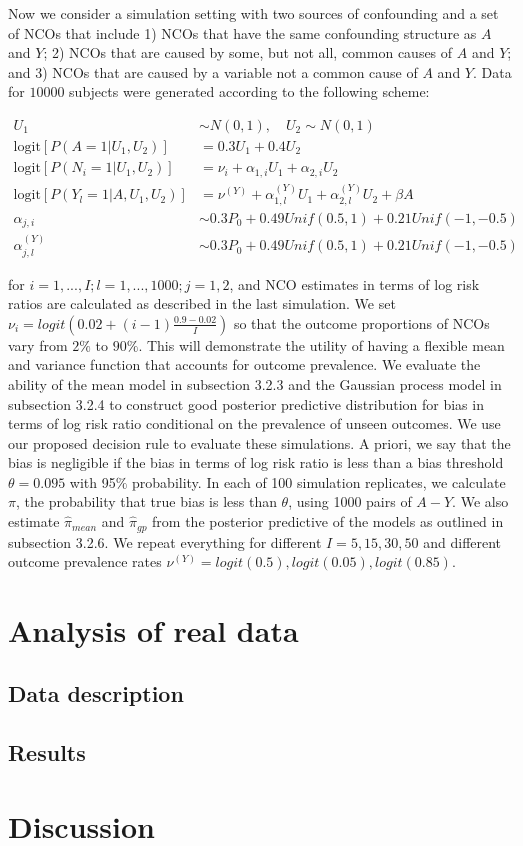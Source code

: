 Now we consider a simulation setting with two sources of confounding and a set of NCOs that include 1) NCOs that have the same confounding structure as $A$ and $Y$; 2) NCOs that are caused by some, but not all, common causes of $A$ and $Y$; and 3) NCOs that are caused by a variable not a common cause of $A$ and $Y$. Data for $10000$ subjects were generated according to the following scheme:

\begin{align*}
    U_1 &\sim N(0, 1), \quad U_2 \sim N(0, 1)\\
    \text{logit}[P(A=1|U_1, U_2)] &= 0.3 U_1 + 0.4 U_2\\
    \text{logit}[P(N_{i}=1|U_1, U_2)] &= \nu_i + \alpha_{1,i} U_1 + \alpha_{2,i} U_2 \\
    \text{logit}[P(Y_l=1|A, U_1, U_2)] &= \nu^{(Y)} + \alpha^{(Y)}_{1,l} U_1 + \alpha^{(Y)}_{2, l}U_2 + \beta A\\
    \alpha_{j,i} &\sim 0.3P_0 + 0.49 Unif(0.5, 1) + 0.21 Unif(-1, -0.5)\\
    \alpha^{(Y)}_{j,l} &\sim 0.3P_0 + 0.49 Unif(0.5, 1) + 0.21 Unif(-1, -0.5)
\end{align*}

\noindent for $i=1,..., I; l=1,...,1000; j=1,2$, and NCO estimates in terms of log risk ratios are calculated as described in the last simulation. We set $\nu_i = logit(0.02 + (i - 1)\frac{0.9-0.02}{I})$ so that the outcome proportions of NCOs vary from $2\%$ to $90\%$. This will demonstrate the utility of having a flexible mean and variance function that accounts for outcome prevalence. We evaluate the ability of the mean model in subsection 3.2.3 and the Gaussian process model in subsection 3.2.4 to construct good posterior predictive distribution for bias in terms of log risk ratio conditional on the prevalence of unseen outcomes. We use our proposed decision rule to evaluate these simulations. A priori, we say that the bias is negligible if the bias in terms of log risk ratio is less than a bias threshold $\theta = 0.095$ with 95$\%$ probability. In each of 100 simulation replicates, we calculate $\pi$, the probability that true bias is less than $\theta$, using 1000 pairs of $A-Y$. We also estimate $\hat{\pi}_{mean}$ and $\hat{\pi}_{gp}$ from the posterior predictive of the models as outlined in subsection 3.2.6. We repeat everything for different $I=5, 15, 30, 50$ and different outcome prevalence rates $\nu^{(Y)} = logit(0.5), logit(0.05), logit(0.85)$.


\section{Analysis of real data}
\subsection{Data description}
\subsection{Results}

\section{Discussion}
